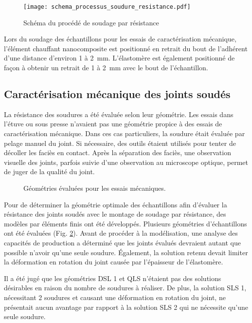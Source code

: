 \begin{figure}[h]
	\centering
	\texttt{[image: schema\_processus\_soudure\_resistance.pdf]}
	\caption{Schéma du procédé de soudage par résistance}
	\label{fig:schema_processus_soudure_resistance}
\end{figure}

Lors du soudage des échantillons pour les essais de caractérisation mécanique, l'élément chauffant nanocomposite est positionné en retrait du bout de l'adhérent d'une distance d'environ 1 à \SI{2}{\milli\metre}. 
L'élastomère est également positionné de façon à obtenir un retrait de 1 à \SI{2}{\milli\metre} avec le bout de l'échantillon. 

\subsection{Caractérisation mécanique des joints soudés}

La résistance des soudures a été évaluée selon leur géométrie. 
Les essais dans l'étuve ou sous presse n'avaient pas une géométrie propice à des essais de caractérisation mécanique. 
Dans ces cas particuliers, la soudure était évaluée par pelage manuel du joint. 
Si nécessaire, des outils étaient utilisés pour tenter de décoller les faciès en contact. 
Après la séparation des faciès, une observation visuelle des joints, parfois suivie d'une observation au microscope optique, permet de juger de la qualité du joint. 

\begin{figure}[h]
	\centering
	
	\caption{Géométries évaluées pour les essais mécaniques. }
	\label{fig:geometrie_echantillons}
\end{figure}


Pour de déterminer la géométrie optimale des échantillons afin d'évaluer la résistance des joints soudés avec le montage de soudage par résistance, des modèles par éléments finis ont été développés. 
Plusieurs géométries d'échantillons ont été évaluées (Fig. \ref{fig:geometrie_echantillons}). 
Avant de procéder à la modélisation, une analyse des capacités de production a déterminé que les joints évalués devraient autant que possible n'avoir qu'une seule soudure. 
Également, la solution retenu devait limiter la déformation en rotation du joint causée par l'épaisseur de l'élastomère. 

Il a été jugé que les géométries DSL 1 et QLS n'étaient pas des solutions désirables en raison du nombre de soudures à réaliser. 
De plus, la solution SLS 1, nécessitant 2 soudures et causant une déformation en rotation du joint, ne présentait aucun avantage par rapport à la solution SLS 2 qui ne nécessite qu'une seule soudure. 

